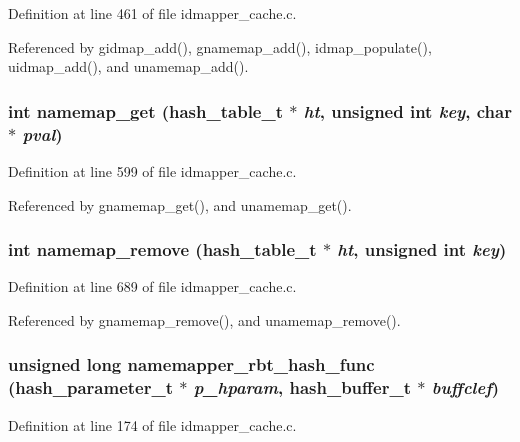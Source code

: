 Definition at line 461 of file idmapper\_\-cache.c.

Referenced by gidmap\_\-add(), gnamemap\_\-add(), idmap\_\-populate(), uidmap\_\-add(), and unamemap\_\-add().
\subsubsection{\setlength{\rightskip}{0pt plus 5cm}int namemap\_\-get (hash\_\-table\_\-t $\ast$ {\em ht}, unsigned int {\em key}, char $\ast$ {\em pval})}\label{idmapper__cache_8c_a26}




Definition at line 599 of file idmapper\_\-cache.c.

Referenced by gnamemap\_\-get(), and unamemap\_\-get().
\subsubsection{\setlength{\rightskip}{0pt plus 5cm}int namemap\_\-remove (hash\_\-table\_\-t $\ast$ {\em ht}, unsigned int {\em key})}\label{idmapper__cache_8c_a32}




Definition at line 689 of file idmapper\_\-cache.c.

Referenced by gnamemap\_\-remove(), and unamemap\_\-remove().
\subsubsection{\setlength{\rightskip}{0pt plus 5cm}unsigned long namemapper\_\-rbt\_\-hash\_\-func (hash\_\-parameter\_\-t $\ast$ {\em p\_\-hparam}, hash\_\-buffer\_\-t $\ast$ {\em buffclef})}\label{idmapper__cache_8c_a9}




Definition at line 174 of file idmapper\_\-cache.c.
